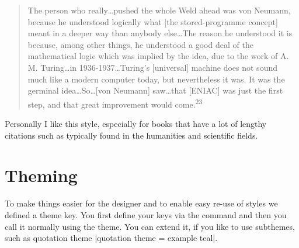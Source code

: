 








\begin{quotation}

The person who really\ldots pushed the whole Weld ahead was von Neumann, because he
understood logically what [the stored-programme concept] meant in a deeper way than
anybody else\ldots The reason he understood it is because, among other things, he understood
a good deal of the mathematical logic which was implied by the idea, due to the
work of A. M. Turing\ldots in 1936-1937\ldots Turing's [universal] machine does not sound
much like a modern computer today, but nevertheless it was. It was the germinal
idea\ldots So\ldots [von Neumann] saw\ldots that \textsc{[ENIAC]} was just the first step, and that great
improvement would come.\textsuperscript{23}
\end{quotation}

\bottomline

Personally I like this style, especially for books that have a lot
of lengthy citations such as typically found in the humanities and
scientific fields.

\section{Theming}

To make things easier for the designer and to enable easy re-use of
styles we defined a theme key. You first define your keys via
the  command and then you call it normally using the 
theme. You can extend it, if you like to use subthemes, such as 
quotation theme |quotation theme = example teal|. 

\begin{teX}
\end{teX}







